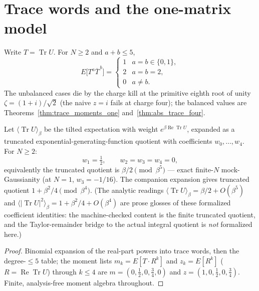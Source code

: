 \section{Trace words and the one-matrix model}

\begin{theorem}\label{thm:trace_words}
\leanok
{}
Write $T=\operatorname{Tr}U$. For $N\geq2$ and $a+b\leq5$,
\[
E\bigl[T^{a}\overline{T}^{\,b}\bigr]
=\begin{cases}
1 & a=b\in\{0,1\},\\
2 & a=b=2,\\
0 & a\neq b .
\end{cases}
\]
The unbalanced cases die by the charge kill at the primitive eighth
root of unity $\zeta=(1+i)/\sqrt2$ (the naive $z=i$ fails at charge
four); the balanced values are
Theorems~\ref{thm:trace_moments_one} and~\ref{thm:abs_trace_four}.
\end{theorem}

\begin{theorem}\label{thm:one_matrix_model}
\leanok
{}
Let $\langle\operatorname{Tr}U\rangle_{\beta}$ be the tilted
expectation with weight $e^{\beta\operatorname{Re}\operatorname{Tr}U}$,
expanded as a truncated exponential-generating-function quotient with
coefficients $w_{0},\dots,w_{4}$. For $N\geq2$:
\[
w_{1}=\tfrac12,\qquad w_{2}=w_{3}=w_{4}=0,
\]
equivalently the truncated quotient is $\beta/2\pmod{\beta^{5}}$
--- exact finite-$N$ mock-Gaussianity (at $N=1$, $w_{3}=-1/16$).
The companion expansion gives truncated quotient
$1+\beta^{2}/4\pmod{\beta^{4}}$. (The analytic readings
$\langle\operatorname{Tr}U\rangle_{\beta}=\beta/2+O(\beta^{5})$ and
$\langle|\operatorname{Tr}U|^{2}\rangle_{\beta}=1+\beta^{2}/4
+O(\beta^{4})$ are prose glosses of these formalized coefficient
identities: the machine-checked content is the finite truncated
quotient, and the Taylor-remainder bridge to the actual integral
quotient is \emph{not} formalized here.)
\end{theorem}
\begin{proof}
\leanok
{}
Binomial expansion of the real-part powers into trace words, then the
degree-$\leq5$ table; the moment lists
$m_{k}=E[T\cdot R^{k}]$ and $z_{k}=E[R^{k}]$
($R=\operatorname{Re}\operatorname{Tr}U$) through $k\leq4$ are
$m=(0,\tfrac12,0,\tfrac34,0)$ and $z=(1,0,\tfrac12,0,\tfrac34)$.
Finite, analysis-free moment algebra throughout.
\end{proof}

